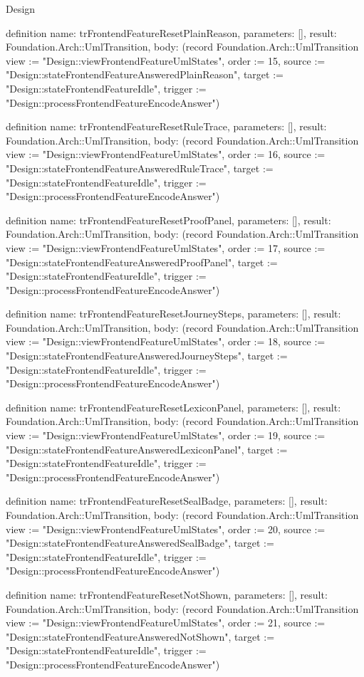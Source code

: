 \begin{lexlean}{Design}
\begin{semanticmodule}
definition{
  name: trFrontendFeatureResetPlainReason,
  parameters: [],
  result: Foundation.Arch::UmlTransition,
  body: (record Foundation.Arch::UmlTransition {view := "Design::viewFrontendFeatureUmlStates", order := 15, source := "Design::stateFrontendFeatureAnsweredPlainReason", target := "Design::stateFrontendFeatureIdle", trigger := "Design::processFrontendFeatureEncodeAnswer"})
}

definition{
  name: trFrontendFeatureResetRuleTrace,
  parameters: [],
  result: Foundation.Arch::UmlTransition,
  body: (record Foundation.Arch::UmlTransition {view := "Design::viewFrontendFeatureUmlStates", order := 16, source := "Design::stateFrontendFeatureAnsweredRuleTrace", target := "Design::stateFrontendFeatureIdle", trigger := "Design::processFrontendFeatureEncodeAnswer"})
}

definition{
  name: trFrontendFeatureResetProofPanel,
  parameters: [],
  result: Foundation.Arch::UmlTransition,
  body: (record Foundation.Arch::UmlTransition {view := "Design::viewFrontendFeatureUmlStates", order := 17, source := "Design::stateFrontendFeatureAnsweredProofPanel", target := "Design::stateFrontendFeatureIdle", trigger := "Design::processFrontendFeatureEncodeAnswer"})
}

definition{
  name: trFrontendFeatureResetJourneySteps,
  parameters: [],
  result: Foundation.Arch::UmlTransition,
  body: (record Foundation.Arch::UmlTransition {view := "Design::viewFrontendFeatureUmlStates", order := 18, source := "Design::stateFrontendFeatureAnsweredJourneySteps", target := "Design::stateFrontendFeatureIdle", trigger := "Design::processFrontendFeatureEncodeAnswer"})
}

definition{
  name: trFrontendFeatureResetLexiconPanel,
  parameters: [],
  result: Foundation.Arch::UmlTransition,
  body: (record Foundation.Arch::UmlTransition {view := "Design::viewFrontendFeatureUmlStates", order := 19, source := "Design::stateFrontendFeatureAnsweredLexiconPanel", target := "Design::stateFrontendFeatureIdle", trigger := "Design::processFrontendFeatureEncodeAnswer"})
}

definition{
  name: trFrontendFeatureResetSealBadge,
  parameters: [],
  result: Foundation.Arch::UmlTransition,
  body: (record Foundation.Arch::UmlTransition {view := "Design::viewFrontendFeatureUmlStates", order := 20, source := "Design::stateFrontendFeatureAnsweredSealBadge", target := "Design::stateFrontendFeatureIdle", trigger := "Design::processFrontendFeatureEncodeAnswer"})
}

definition{
  name: trFrontendFeatureResetNotShown,
  parameters: [],
  result: Foundation.Arch::UmlTransition,
  body: (record Foundation.Arch::UmlTransition {view := "Design::viewFrontendFeatureUmlStates", order := 21, source := "Design::stateFrontendFeatureAnsweredNotShown", target := "Design::stateFrontendFeatureIdle", trigger := "Design::processFrontendFeatureEncodeAnswer"})
}


\end{semanticmodule}
\end{lexlean}
